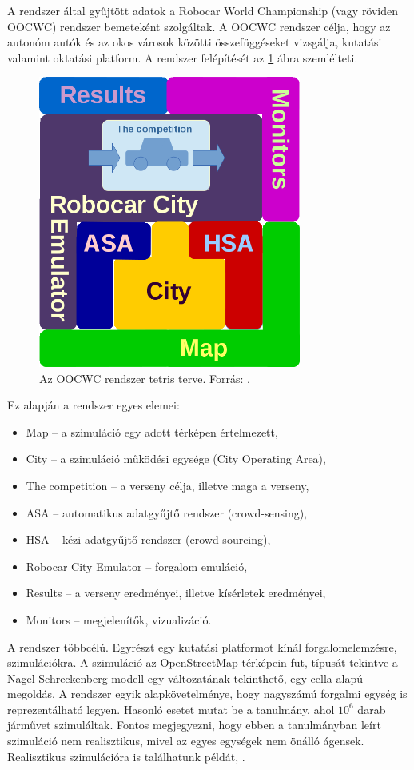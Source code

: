 \documentclass[a4paper,12pt]{report}
\begin{document}
A rendszer által gyűjtött adatok a Robocar World Championship (vagy röviden OOCWC) rendszer bemeteként szolgáltak. A OOCWC rendszer célja, hogy az autonóm autók és az okos városok közötti összefüggéseket vizsgálja, kutatási valamint oktatási platform. A rendszer felépítését az \ref{basedesign} ábra szemlélteti.

\begin{figure}[h]
\centerline{
\includegraphics[width=3.4in]{img/tetris_plan}}
\caption{Az OOCWC rendszer tetris terve. Forrás: \cite{oocwcrepo}.}
\label{basedesign}
\end{figure}

Ez alapján a rendszer egyes elemei:

\begin{itemize}
\item Map -- a szimuláció egy adott térképen értelmezett,
\item City -- a szimuláció működési egysége (City Operating Area),
\item The competition -- a verseny célja, illetve maga a verseny,
\item ASA -- automatikus adatgyűjtő rendszer (crowd-sensing),
\item HSA -- kézi adatgyűjtő rendszer (crowd-sourcing),
\item Robocar City Emulator -- forgalom emuláció,
\item Results -- a verseny eredményei, illetve kísérletek eredményei,
\item Monitors -- megjelenítők, vizualizáció.
\end{itemize}

A rendszer többcélú. Egyrészt egy kutatási platformot kínál forgalomelemzésre, szimulációkra. A szimuláció az OpenStreetMap \cite{osm} térképein fut, típusát tekintve a Nagel-Schreckenberg modell \cite{nasch} egy változatának tekinthető, egy cella-alapú megoldás. A rendszer egyik alapkövetelménye, hogy nagyszámú forgalmi egység is reprezentálható legyen. Hasonló esetet mutat be a \cite{singapore} tanulmány, ahol $10^6$ darab járművet szimuláltak. Fontos megjegyezni, hogy ebben a tanulmányban leírt szimuláció nem realisztikus, mivel az egyes egységek nem önálló ágensek. Realisztikus szimulációra is találhatunk példát, \cite{realsim}.
\end{document}
